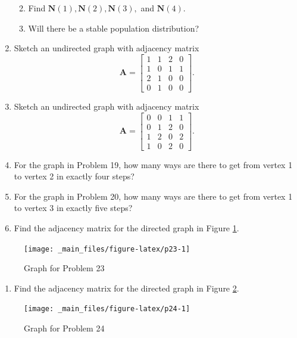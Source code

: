 \documentclass[
]{book}
\providecommand{\tightlist}{%
  \setlength{\itemsep}{0pt}\setlength{\parskip}{0pt}}
\theoremstyle{definition}
\theoremstyle{definition}
\theoremstyle{definition}
\theoremstyle{definition}
\theoremstyle{remark}
\begin{document}
\begin{enumerate}
  \begin{enumerate}
  \def\labelenumii{\alph{enumii}.}
  \tightlist
  \item
    Find \(\mathbf{N}(1), \mathbf{N}(2), \mathbf{N}(3),\) and \(\mathbf{N}(4).\)
  \item
    Will there be a stable population distribution?
  \end{enumerate}
\item
  Sketch an undirected graph with adjacency matrix
  \[\mathbf{A}=\begin{bmatrix} 1 & 1 & 2 & 0\\1 & 0 & 1 & 1\\2 & 1 & 0 & 0\\0 & 1 & 0 & 0\end{bmatrix}.\]
\item
  Sketch an undirected graph with adjacency matrix
  \[\mathbf{A}=\begin{bmatrix} 0 & 0 & 1 & 1\\0 & 1 & 2 & 0\\1 & 2 & 0 & 2\\1 & 0 & 2 & 0\end{bmatrix}.\]
\item
  For the graph in Problem 19, how many ways are there to get from vertex 1 to vertex 2 in exactly four steps?
\item
  For the graph in Problem 20, how many ways are there to get from vertex 1 to vertex 3 in exactly five steps?
\item
  Find the adjacency matrix for the directed graph in Figure \ref{fig:p23}.
\end{enumerate}

\begin{figure}

{\centering \texttt{[image: \_main\_files/figure-latex/p23-1]} 

}

\caption{Graph for Problem 23}\label{fig:p23}
\end{figure}

\begin{enumerate}
\def\labelenumi{\arabic{enumi}.}
\setcounter{enumi}{23}
\tightlist
\item
  Find the adjacency matrix for the directed graph in Figure \ref{fig:p24}.
\end{enumerate}

\begin{figure}

{\centering \texttt{[image: \_main\_files/figure-latex/p24-1]} 

}

\caption{Graph for Problem 24}\label{fig:p24}
\end{figure}
\end{document}
